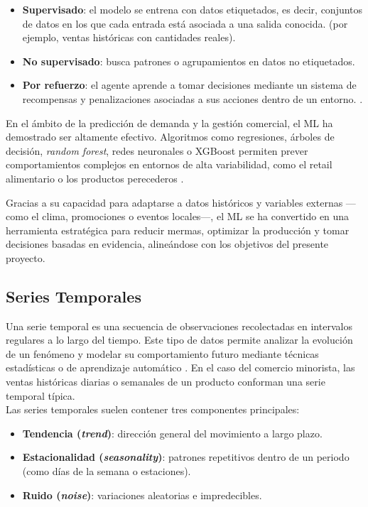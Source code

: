 \begin{itemize}
    \item \textbf{Supervisado}: el modelo se entrena con datos etiquetados, es decir, conjuntos de datos en los que cada entrada está asociada a una salida conocida. (por ejemplo, ventas históricas con cantidades reales).
    
    \item \textbf{No supervisado}: busca patrones o agrupamientos en datos no etiquetados.
    
    \item \textbf{Por refuerzo}:  el agente aprende a tomar decisiones mediante un sistema de recompensas y penalizaciones asociadas a sus acciones dentro de un entorno. \parencite{sutton2018}.
\end{itemize}

En el ámbito de la predicción de demanda y la gestión comercial, el ML ha demostrado ser altamente efectivo. Algoritmos como regresiones, árboles de decisión, \textit{random forest}, redes neuronales o XGBoost permiten prever comportamientos complejos en entornos de alta variabilidad, como el retail alimentario o los productos perecederos \parencite{carbonneau2008}.

Gracias a su capacidad para adaptarse a datos históricos y variables externas —como el clima, promociones o eventos locales—, el ML se ha convertido en una herramienta estratégica para reducir mermas, optimizar la producción y tomar decisiones basadas en evidencia, alineándose con los objetivos del presente proyecto.

\subsection{Series Temporales}

Una serie temporal es una secuencia de observaciones recolectadas en intervalos regulares a lo largo del tiempo. Este tipo de datos permite analizar la evolución de un fenómeno y modelar su comportamiento futuro mediante técnicas estadísticas o de aprendizaje automático \parencite{chatfield2004}. En el caso del comercio minorista, las ventas históricas diarias o semanales de un producto conforman una serie temporal típica.\\

Las series temporales suelen contener tres componentes principales:

\begin{itemize}
    \item \textbf{Tendencia (\textit{trend})}: dirección general del movimiento a largo plazo.
    
    \item \textbf{Estacionalidad (\textit{seasonality})}: patrones repetitivos dentro de un periodo (como días de la semana o estaciones).
    
    \item \textbf{Ruido (\textit{noise})}: variaciones aleatorias e impredecibles.
\end{itemize}

